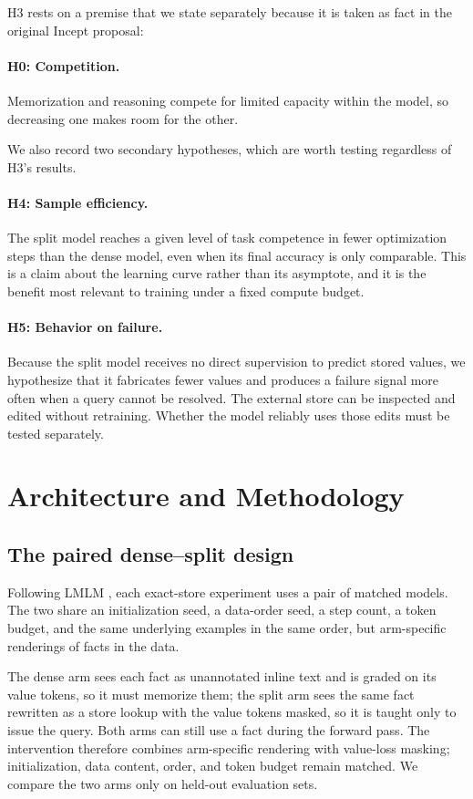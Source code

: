 \documentclass{article}
\begin{document}
H3 rests on a premise that we state separately because it is taken as fact in the original Incept proposal:

\paragraph{H0: Competition.}
Memorization and reasoning compete for limited capacity within the model, so decreasing one makes room for the other.

We also record two secondary hypotheses, which are worth testing regardless of H3's results.

\paragraph{H4: Sample efficiency.}
The split model reaches a given level of task competence in fewer optimization steps than the dense model, even when its final accuracy is only comparable. This is a claim about the learning curve rather than its asymptote, and it is the benefit most relevant to training under a fixed compute budget.

\paragraph{H5: Behavior on failure.}
Because the split model receives no direct supervision to predict stored values, we hypothesize that it fabricates fewer values and produces a failure signal more often when a query cannot be resolved. The external store can be inspected and edited without retraining. Whether the model reliably uses those edits must be tested separately.


\section{Architecture and Methodology}

\subsection{The paired dense--split design}
\label{sec:m0}
Following LMLM \citep{zhao2025lmlm}, each exact-store experiment uses a pair of matched models. The two share an initialization seed, a data-order seed, a step count, a token budget, and the same underlying examples in the same order, but arm-specific renderings of facts in the data.

The dense arm sees each fact as unannotated inline text and is graded on its value tokens, so it must memorize them; the split arm sees the same fact rewritten as a store lookup with the value tokens masked, so it is taught only to issue the query. Both arms can still use a fact during the forward pass. The intervention therefore combines arm-specific rendering with value-loss masking; initialization, data content, order, and token budget remain matched. We compare the two arms only on held-out evaluation sets.
\end{document}
